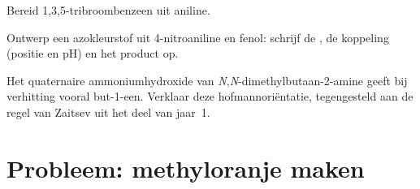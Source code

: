 \begin{exercise}[$\star\star\star$]\label{exo:b2:amines:10}
Bereid 1,3,5-tribroombenzeen uit aniline.
\end{exercise}

\begin{exercise}[$\star\star\star$]\label{exo:b2:amines:11}
Ontwerp een azokleurstof uit 4-nitroaniline en fenol: schrijf de , de koppeling (positie
en pH) en het product op.
\end{exercise}

\begin{exercise}[$\star\star\star$]\label{exo:b2:amines:12}
Het quaternaire ammoniumhydroxide van \textit{N},\textit{N}-dimethylbutaan-2-amine geeft bij verhitting
vooral but-1-een. Verklaar deze hofmannoriëntatie, tegengesteld aan de regel van Zaitsev uit het deel
van jaar~1.
\end{exercise}

\section{Probleem: methyloranje maken}

